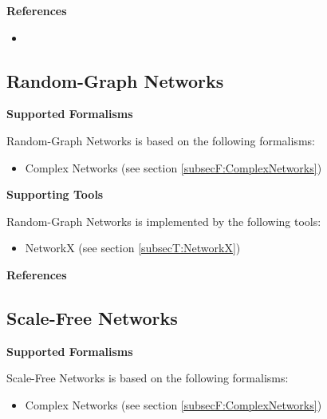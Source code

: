 \textbf{References}
\begin{itemize}
	
\item {}
\end{itemize}



\subsection{Random-Graph Networks}
\label{subsecL:RandomGraphNetworks}



\textbf{Supported Formalisms}

Random-Graph Networks is based on the following formalisms:
\begin{itemize}
	\item Complex Networks (see section \ref{subsecF:ComplexNetworks})
\end{itemize}


\textbf{Supporting Tools}

Random-Graph Networks is implemented by the following tools:
\begin{itemize}
	\item NetworkX (see section \ref{subsecT:NetworkX})
\end{itemize}


\textbf{References}




\subsection{Scale-Free Networks}
\label{subsecL:ScaleFreeNetworks}



\textbf{Supported Formalisms}

Scale-Free Networks is based on the following formalisms:
\begin{itemize}
	\item Complex Networks (see section \ref{subsecF:ComplexNetworks})
\end{itemize}


